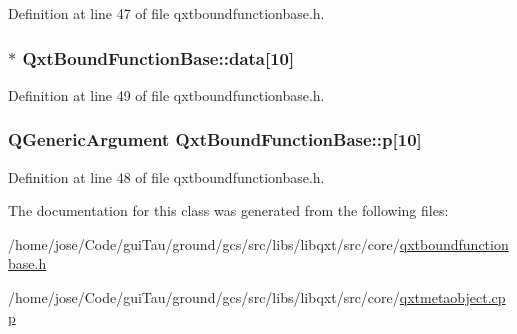 Definition at line 47 of file qxtboundfunctionbase.\-h.

\hypertarget{class_qxt_bound_function_base_a694967386090c9719dda1b19c856d3b6}{
\subsubsection[{data}]{$\ast$ Qxt\-Bound\-Function\-Base\-::data\mbox{[}10\mbox{]}}}\label{class_qxt_bound_function_base_a694967386090c9719dda1b19c856d3b6}


Definition at line 49 of file qxtboundfunctionbase.\-h.

\hypertarget{class_qxt_bound_function_base_a01f11363f446e246f31684cdf2b9e56e}{
\subsubsection[{p}]{\setlength{\rightskip}{0pt plus 5cm}Q\-Generic\-Argument Qxt\-Bound\-Function\-Base\-::p\mbox{[}10\mbox{]}}}\label{class_qxt_bound_function_base_a01f11363f446e246f31684cdf2b9e56e}


Definition at line 48 of file qxtboundfunctionbase.\-h.



The documentation for this class was generated from the following files\-:\begin{DoxyCompactItemize}
\item 
/home/jose/\-Code/gui\-Tau/ground/gcs/src/libs/libqxt/src/core/\hyperlink{qxtboundfunctionbase_8h}{qxtboundfunctionbase.\-h}\item 
/home/jose/\-Code/gui\-Tau/ground/gcs/src/libs/libqxt/src/core/\hyperlink{qxtmetaobject_8cpp}{qxtmetaobject.\-cpp}\end{DoxyCompactItemize}
